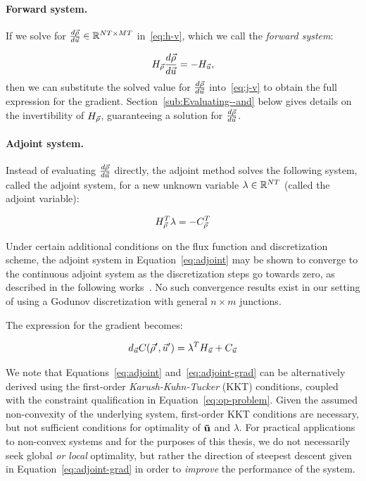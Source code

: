\paragraph{Forward system.\label{par:Forward-system}}

If we solve for $\frac{d\vec{\rho}}{d\vec{u}}\in\mathbb{R}^{NT\times MT}$
in~\eqref{eq:h-v}, which we call the \emph{forward system}:

\[
H_{\vec{\rho}}\frac{d\vec{\rho}}{d\vec{u}}=-H_{\vec{u}},
\]
then we can substitute the solved value for $\frac{d\vec{\rho}}{d\vec{u}}$
into~\eqref{eq:j-v} to obtain the full expression for the gradient.
Section~\ref{sub:Evaluating--and} below gives details on the invertibility
of $H_{\vec{\rho}}$, guaranteeing a solution for $\frac{d\vec{\rho}}{d\vec{u}}$.


\paragraph{Adjoint system.\label{par:Adjoint-system}}

Instead of evaluating $\frac{d\vec{\rho}}{d\vec{u}}$ directly, the adjoint
method solves the following system, called the adjoint system,
for a new unknown variable $\lambda\in\mathbb{R}^{NT}$
(called the adjoint variable):

\begin{equation}
H_{\vec{\rho}}^{T}\lambda=-C_{\vec{\rho}}^{T}\label{eq:adjoint}
\end{equation}

Under certain additional conditions on the flux function and discretization scheme, the adjoint system in Equation~\eqref{eq:adjoint} may be shown to converge to the continuous adjoint system as the discretization steps go towards zero, as described in the following works~\cite{Banda2012Adjoint,Gugat2005,Ulbrich2003AdjointBased}. No such convergence results exist in our setting of using a Godunov discretization with general $n\times m$ junctions.

The expression for the gradient becomes:

\begin{equation}
d_{\control}\cost\left(\nominal{\state},\nominal{\control}\right)=\lambda^{T}\Hu+\Ju\label{eq:adjoint-grad}
\end{equation}

We note that Equations~\eqref{eq:adjoint} and~\eqref{eq:adjoint-grad} can be alternatively derived using the first-order \emph{Karush-Kuhn-Tucker} (KKT) conditions, coupled with the constraint qualification in Equation~\eqref{eq:op-problem}. Given the assumed non-convexity of the underlying system, first-order KKT conditions are necessary, but not sufficient conditions for optimality of $\mathbf{\vec{u}}$ and $\lambda$. For practical applications to non-convex systems and for the purposes of this thesis, we do not necessarily seek global \emph{or local} optimality, but rather the direction of steepest descent given in Equation~\eqref{eq:adjoint-grad} in order to \emph{improve} the performance of the system.

